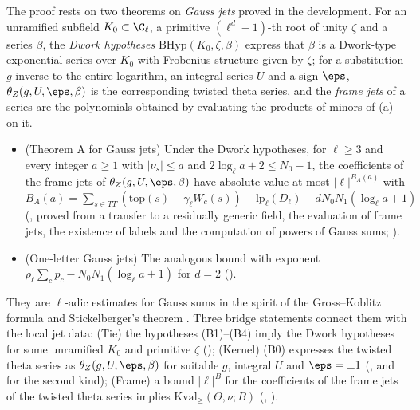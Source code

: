 The proof rests on two theorems on \emph{Gauss jets} proved in the development. For an unramified subfield $K_0\subset\C_\ell$,
a primitive $(\ell^d-1)$-th root of unity $\zeta$ and a series $\beta$, the \emph{Dwork hypotheses}
$\mathrm{BHyp}(K_0,\zeta,\beta)$ express that $\beta$ is a Dwork-type exponential series over $K_0$ with Frobenius
structure given by $\zeta$; for a substitution $g$ inverse to the entire logarithm, an integral series $U$ and a sign
$\eps$, $\theta_Z(g,U,\eps,\beta)$ is the corresponding twisted theta series, and the \emph{frame jets} of a series are the
polynomials obtained by evaluating the products of minors of (a) on it.
\begin{itemize}
\item (Theorem A for Gauss jets) Under the Dwork hypotheses, for $\ell\ge3$ and every integer $a\ge1$ with $|\nu_s|\le a$
and $2\log_\ell a+2\le N_0-1$, the coefficients of the frame jets of $\theta_Z(g,U,\eps,\beta)$ have absolute value at most
$|\ell|^{B_A(a)}$ with $B_A(a)=\sum_{s\in TT}(\mathrm{top}(s)-\gamma_\ell W_c(s))+\mathrm{lp}_\ell(D_\ell)-dN_0N_1(\log_\ell
a+1)$ (, proved from a transfer to a residually generic field,
the evaluation of frame jets, the existence of labels and the computation of powers of Gauss sums;
).
\item (One-letter Gauss jets) The analogous bound with exponent $\rho_\ell\sum_cp_c-N_0N_1(\log_\ell a+1)$ for $d=2$
().
\end{itemize}
They are $\ell$-adic estimates for Gauss sums in the spirit of the Gross--Koblitz formula and Stickelberger's theorem
\cite[Ch.~6]{Washington1997}. Three bridge statements connect them with the local jet data: (Tie) the hypotheses (B1)--(B4)
imply the Dwork hypotheses for some unramified $K_0$ and primitive $\zeta$
(); (Kernel) (B0) expresses the twisted theta series as
$\theta_Z(g,U,\eps,\beta)$ for suitable $g$, integral $U$ and $\eps=\pm1$
(, and
 for the second kind); (Frame)
a bound $|\ell|^{B}$ for the coefficients of the frame jets of the twisted theta series implies
$\mathrm{Kval}_\ge(\Theta,\nu;B)$ (,
).

